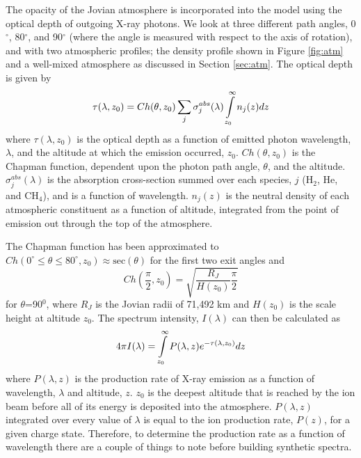 \documentclass[draft]{agujournal2018}
\begin{document}
The opacity of the Jovian atmosphere is incorporated into the model using the optical depth of outgoing X-ray photons.
We look at three different path angles, 0$^{\circ}$, 80$^{\circ}$, and 90$^{\circ}$ (where the angle is measured with respect to the axis of rotation), and with two atmospheric profiles; the density profile shown in Figure \ref{fig:atm} and a well-mixed atmosphere as discussed in Section \ref{sec:atm}.
The optical depth is given by
\begin{equation}
    \tau(\lambda,z_{0})=Ch(\theta,z_{0})\sum_{j}\sigma_{j}^{abs}(\lambda)\int\displaylimits_{z_{0}}^{\infty}n_{j}(z)dz
    \label{eqn:tau}
\end{equation}
where $\tau(\lambda,z_{0})$ is the optical depth as a function of emitted photon wavelength, $\lambda$, and the altitude at which the emission occurred, $z_{0}$.
$Ch(\theta,z_{0})$ is the Chapman function, dependent upon the photon path angle, $\theta$, and the altitude.
$\sigma_j^{abs}(\lambda)$ is the absorption cross-section summed over each species, $j$ (H$_2$, He, and CH$_4$), and is a function of wavelength.
$n_j(z)$ is the neutral density of each atmospheric constituent as a function of altitude, integrated from the point of emission out through the top of the atmosphere.

The Chapman function has been approximated to $Ch(0^{\circ} \leq \theta \leq 80^{\circ},z_{0}) \approx \mathrm{sec}(\theta)$ for the first two exit angles and
\begin{equation}
    Ch(\frac{\pi}{2},z_{0})=\sqrt{\frac{R_J}{H(z_0)}\frac{\pi}{2}}
    \label{eqn:Chap}
\end{equation}
for $\theta$=90$^{0}$, where $R_J$ is the Jovian radii of 71,492 km and $H(z_0)$ is the scale height at altitude $z_0$.
The spectrum intensity, $I(\lambda)$ can then be calculated as
\begin{equation}
    4\pi I(\lambda)=\int\displaylimits_{z_0}^{\infty}P(\lambda,z)e^{-\tau(\lambda,z_0)}dz
    \label{eqn:I}
\end{equation}
where $P(\lambda,z)$ is the production rate of X-ray emission as a function of wavelength, $\lambda$ and altitude, $z$.
$z_0$ is the deepest altitude that is reached by the ion beam before all of its energy is deposited into the atmosphere.
$P(\lambda,z)$ integrated over every value of $\lambda$ is equal to the ion production rate, $P(z)$, for a given charge state.
Therefore, to determine the production rate as a function of wavelength there are a couple of things to note before building synthetic spectra.
\end{document}
